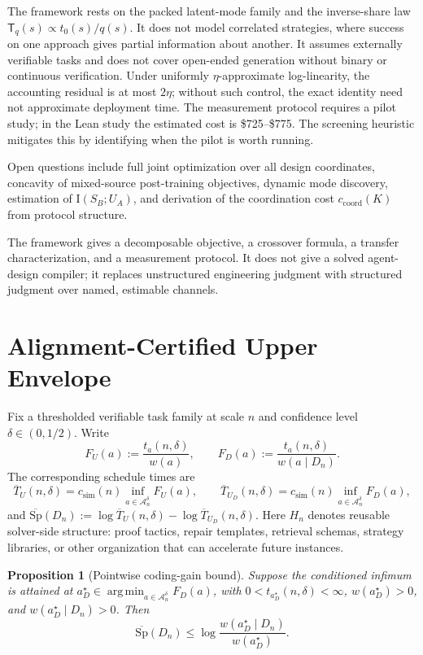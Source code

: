 \documentclass[10pt]{article}
\DeclareMathOperator*{\argmin}{arg\,min}
\theoremstyle{paperplain}
\newtheorem{proposition}[theorem]{Proposition}
\theoremstyle{paperdefinition}
\theoremstyle{paperremark}
\newcommand{\I}{\mathrm{I}}
\newcommand{\cA}{\mathcal{A}}
\newcommand{\Sp}{\mathrm{Sp}}
\begin{document}
The framework rests on the packed latent-mode family and the inverse-share law $\mathsf{T}_q(s)\propto t_0(s)/q(s)$. It does not model correlated strategies, where success on one approach gives partial information about another. It assumes externally verifiable tasks and does not cover open-ended generation without binary or continuous verification. Under uniformly $\eta$-approximate log-linearity, the accounting residual is at most $2\eta$; without such control, the exact identity need not approximate deployment time.
The measurement protocol requires a pilot study; in the Lean study the estimated cost is \$725--\$775. The screening heuristic mitigates this by identifying when the pilot is worth running.

Open questions include full joint optimization over all design coordinates, concavity of mixed-source post-training objectives, dynamic mode discovery, estimation of $\I(S_B;U_A)$, and derivation of the coordination cost $c_{\mathrm{coord}}(K)$ from protocol structure.

The framework gives a decomposable objective, a crossover formula, a transfer characterization, and a measurement protocol. It does not give a solved agent-design compiler; it replaces unstructured engineering judgment with structured judgment over named, estimable channels.

\appendix

\section{Alignment-Certified Upper Envelope}
\label{app:upper-envelope}

Fix a thresholded verifiable task family at scale $n$ and confidence level $\delta\in(0,1/2)$. Write
\[
F_U(a):=\frac{t_a(n,\delta)}{w(a)},\qquad
F_D(a):=\frac{t_a(n,\delta)}{w(a\mid D_n)}.
\]
The corresponding schedule times are
\[
\overline T_U(n,\delta)=c_{\mathrm{sim}}(n)\inf_{a\in\cA_n^\delta}F_U(a),
\qquad
\overline T_{U_D}(n,\delta)=c_{\mathrm{sim}}(n)\inf_{a\in\cA_n^\delta}F_D(a),
\]
and $\overline{\Sp}(D_n):=\log \overline T_U(n,\delta)-\log \overline T_{U_D}(n,\delta)$.
Here $H_n$ denotes reusable solver-side structure: proof tactics, repair templates, retrieval schemas, strategy libraries, or other organization that can accelerate future instances.

\begin{proposition}[Pointwise coding-gain bound]
\label{prop:coding-gain}
Suppose the conditioned infimum is attained at
$a_D^\star\in\argmin_{a\in\cA_n^\delta}F_D(a)$, with $0<t_{a_D^\star}(n,\delta)<\infty$, $w(a_D^\star)>0$, and $w(a_D^\star\mid D_n)>0$. Then
\[
\overline{\Sp}(D_n)
\le
\log\frac{w(a_D^\star\mid D_n)}{w(a_D^\star)}.
\]
\end{proposition}
\end{document}
